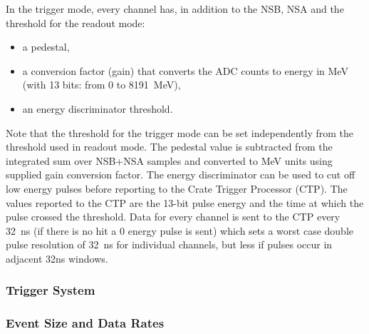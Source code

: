 In the trigger mode, every channel has, in addition to the NSB, NSA and the threshold for the readout mode:  \begin{itemize}
 \item a pedestal, 
 \item a conversion factor (gain) that converts the ADC counts to energy in MeV (with 13 bits:  from 0 to 8191~MeV), 
 \item an energy discriminator threshold.
 \end{itemize}
Note that the threshold for the trigger mode can be set independently from the threshold used in readout mode.
The pedestal value is subtracted from the integrated sum over NSB+NSA samples and 
converted to MeV units using supplied gain conversion factor. The energy discriminator can be used to cut off low energy pulses before reporting to the Crate Trigger Processor (CTP). 
The values reported to the CTP are the 13-bit pulse energy and the time at which the pulse crossed the threshold. 
Data for every channel is sent to the CTP every 32~ns (if there is no hit a 0 energy pulse is sent) which sets a worst case double pulse resolution of 32~ns for individual channels, but less if pulses occur in adjacent 32ns windows.







\subsubsection{Trigger System}
\label{sec:triggerdaq}


\subsubsection{Event Size and Data Rates}

